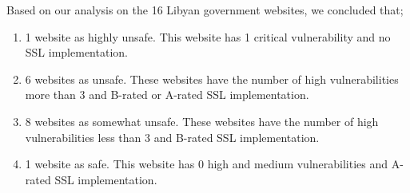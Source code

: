 \documentclass[conference]{IEEEtran}
\begin{document}
\renewcommand{\arraystretch}{1.3}



Based on our analysis on the 16 Libyan government websites, we
concluded that;
\begin{enumerate}
	\item 1 website as highly unsafe. This website has 1 critical vulnerability and no SSL implementation.
	\item 6 websites as unsafe. These websites have the number of high vulnerabilities more than 3 and B-rated or A-rated SSL implementation.
	\item 8 websites as somewhat unsafe. These websites have the number of high vulnerabilities less than 3 and B-rated SSL implementation.
	\item 1 website as safe. This website has 0 high and medium vulnerabilities and A-rated SSL implementation.
\end{enumerate} 
\end{document}
